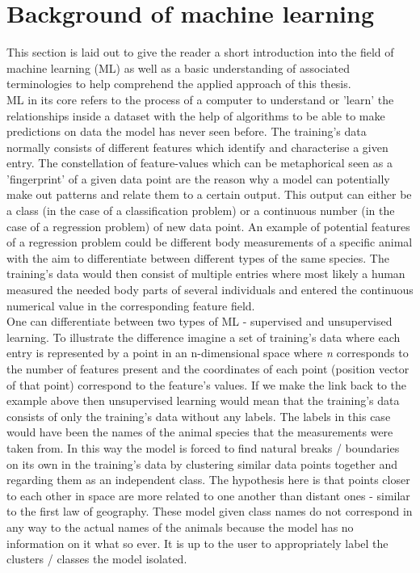 \section{Background of machine learning}
This section is laid out to give the reader a short introduction into the field of machine learning (ML) as well as a basic understanding of associated terminologies to help comprehend the applied approach of this thesis.\\
ML in its core refers to the process of a computer to understand or 'learn' the relationships inside a dataset with the help of algorithms to be able to make predictions on data the model has never seen before.
The training's data normally consists of different features which identify and characterise a given entry. The constellation of feature-values which can be metaphorical seen as a 'fingerprint' of a given data point are the reason why a model can potentially make out patterns and relate them to a certain output. This output can either be a class (in the case of a classification problem) or a continuous number (in the case of a regression problem) of new data point.
An example of potential features of a regression problem could be different body measurements of a specific animal with the aim to differentiate between different types of the same species. The training's data would then consist of multiple entries where most likely a human measured the needed body parts of several individuals and entered the continuous numerical value in the corresponding feature field.\\
\newline
One can differentiate between two types of ML - supervised and unsupervised learning. To illustrate the difference imagine a set of training's data where each entry is represented by a point in an n-dimensional space where \textit{n} corresponds to the number of features present and the coordinates of each point (position vector of that point) correspond to the feature's values. If we make the link back to the example above then unsupervised learning would mean that the training's data consists of only the training's data without any labels. The labels in this case would have been the names of the animal species that the measurements were taken from. In this way the model is forced to find natural breaks / boundaries on its own in the training's data by clustering similar data points together and regarding them as an independent class. The hypothesis here is that points closer to each other in space are more related to one another than distant ones - similar to the first law of geography. These model given class names do not correspond in any way to the actual names of the animals because the model has no information on it what so ever. It is up to the user to appropriately label the clusters / classes the model isolated.

